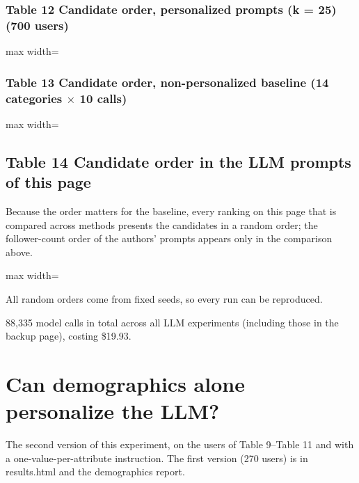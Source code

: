 \documentclass[10pt]{article}
\begin{document}
\subsubsection*{Table 12 \textperiodcentered{} Candidate order, personalized prompts (k = 25) (700 users)}
\begin{center}\begin{adjustbox}{max width=\linewidth}

\end{adjustbox}\end{center}

\subsubsection*{Table 13 \textperiodcentered{} Candidate order, non-personalized baseline (14 categories $\times$ 10 calls)}
\begin{center}\begin{adjustbox}{max width=\linewidth}

\end{adjustbox}\end{center}

\subsection*{Table 14 \textperiodcentered{} Candidate order in the LLM prompts of this page}
Because the order matters for the baseline, every ranking on this page that is compared across methods presents the candidates in a random order; the follower-count order of the authors' prompts appears only in the comparison above.

\begin{center}\begin{adjustbox}{max width=\linewidth}

\end{adjustbox}\end{center}

{\small All random orders come from fixed seeds, so every run can be reproduced.}

{\small 88,335 model calls in total across all LLM experiments (including those in the backup page), costing \$19.93.}

\section{Can demographics alone personalize the LLM?}
The second version of this experiment, on the users of Table 9--Table 11 and with a one-value-per-attribute instruction. The first version (270 users) is in results.html and the demographics report.
\end{document}
